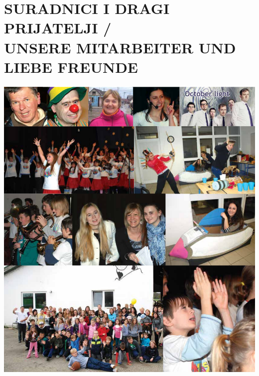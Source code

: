 \documentclass[a4paper,twoside, svgnames]{article}
\begin{document}
\section*{SURADNICI I DRAGI PRIJATELJI /\\ UNSERE MITARBEITER UND LIEBE FREUNDE}
\begin{center}
\vspace{1cm}
\includegraphics[width=1\linewidth]{images/suradnici}\\
\end{center}
\end{document}

